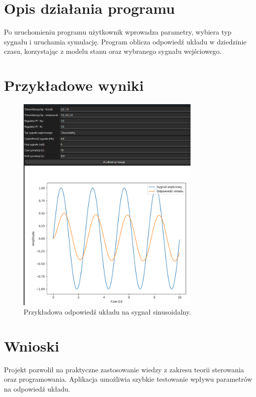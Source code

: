 \documentclass[12pt,a4paper]{article}
\begin{document}
\section{Opis działania programu}
Po uruchomieniu programu użytkownik wprowadza parametry, wybiera typ sygnału i uruchamia symulację. Program oblicza odpowiedź układu w dziedzinie czasu, korzystając z modelu stanu oraz wybranego sygnału wejściowego.

\section{Przykładowe wyniki}
\begin{figure}[h!]
    \centering
    \includegraphics[width=0.8\textwidth]{wykres1.png}
    \caption{Przykładowa odpowiedź układu na sygnał sinusoidalny.}
\end{figure}



\section{Wnioski}
Projekt pozwolił na praktyczne zastosowanie wiedzy z zakresu teorii sterowania oraz programowania. Aplikacja umożliwia szybkie testowanie wpływu parametrów na odpowiedź układu.
\end{document}
